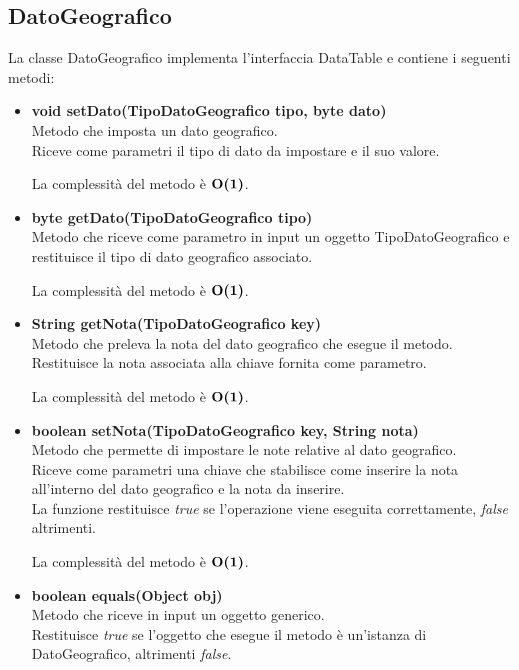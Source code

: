 \documentclass[a4paper, 12pt]{scrreprt}
\begin{document}
			\subsection{DatoGeografico}
			La classe DatoGeografico implementa l'interfaccia DataTable e contiene i seguenti metodi:
			\begin{itemize}
				\item \textbf{void setDato(TipoDatoGeografico tipo, byte dato)}
				\\Metodo che imposta un dato geografico.
				\\Riceve come parametri il tipo di dato da impostare e il suo valore.
				
				La complessit\`a del metodo \`e $\mathbf{O}\textbf{(1)}$.
				
				\item \textbf{byte getDato(TipoDatoGeografico tipo)}
				\\Metodo che riceve come parametro in input un oggetto TipoDatoGeografico e restituisce il tipo di dato geografico associato.
				
				La complessit\`a del metodo \`e $\mathbf{O}\textbf{(1)}$.
				
				\item \textbf{String getNota(TipoDatoGeografico key)}
				\\Metodo che preleva la nota del dato geografico che esegue il metodo.
				\\Restituisce la nota associata alla chiave fornita come parametro.
				
				La complessit\`a del metodo \`e $\mathbf{O}\textbf{(1)}$.
				
				\item \textbf{boolean setNota(TipoDatoGeografico key, String nota)}
				\\Metodo che permette di impostare le note relative al dato geografico.
				\\Riceve come parametri una chiave che stabilisce come inserire la nota all'interno del dato geografico e la nota da inserire.
				\\La funzione restituisce \textit{true} se l'operazione viene eseguita correttamente, \textit{false} altrimenti.
				
				La complessit\`a del metodo \`e $\mathbf{O}\textbf{(1)}$.
				
				\item \textbf{boolean equals(Object obj)}
				\\Metodo che riceve in input un oggetto generico.
				\\Restituisce \textit{true} se l'oggetto che esegue il metodo \`e un'istanza di DatoGeografico, altrimenti \textit{false}.
				

\end{itemize}
\end{document}
